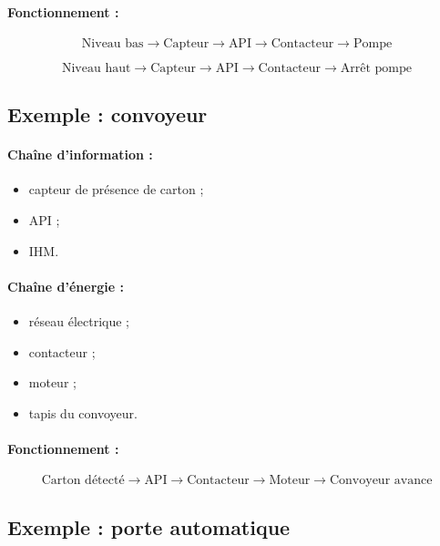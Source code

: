 \paragraph{Fonctionnement :}

\[
\text{Niveau bas} \rightarrow \text{Capteur} \rightarrow \text{API} \rightarrow \text{Contacteur} \rightarrow \text{Pompe}
\]

\[
\text{Niveau haut} \rightarrow \text{Capteur} \rightarrow \text{API} \rightarrow \text{Contacteur} \rightarrow \text{Arrêt pompe}
\]

\subsection{Exemple : convoyeur}

\paragraph{Chaîne d'information :}
\begin{itemize}
    \item capteur de présence de carton ;
    \item API ;
    \item IHM.
\end{itemize}

\paragraph{Chaîne d'énergie :}
\begin{itemize}
    \item réseau électrique ;
    \item contacteur ;
    \item moteur ;
    \item tapis du convoyeur.
\end{itemize}

\paragraph{Fonctionnement :}

\[
\text{Carton détecté} \rightarrow \text{API} \rightarrow \text{Contacteur} \rightarrow \text{Moteur} \rightarrow \text{Convoyeur avance}
\]

\subsection{Exemple : porte automatique}

